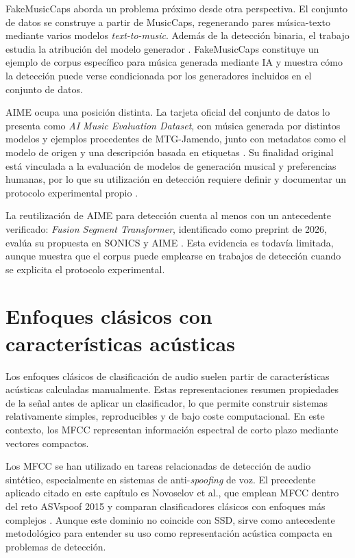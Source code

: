 FakeMusicCaps aborda un problema próximo desde otra perspectiva. El conjunto de datos se construye a partir de MusicCaps, regenerando pares música-texto mediante varios modelos \textit{text-to-music}. Además de la detección binaria, el trabajo estudia la atribución del modelo generador \cite{comanducci2024fakemusiccaps}. FakeMusicCaps constituye un ejemplo de corpus específico para música generada mediante IA y muestra cómo la detección puede verse condicionada por los generadores incluidos en el conjunto de datos.

AIME ocupa una posición distinta. La tarjeta oficial del conjunto de datos lo presenta como \textit{AI Music Evaluation Dataset}, con música generada por distintos modelos y ejemplos procedentes de MTG-Jamendo, junto con metadatos como el modelo de origen y una descripción basada en etiquetas \cite{discoethAIME}. Su finalidad original está vinculada a la evaluación de modelos de generación musical y preferencias humanas, por lo que su utilización en detección requiere definir y documentar un protocolo experimental propio \cite{groetschla2025benchmarking}.

La reutilización de AIME para detección cuenta al menos con un antecedente verificado: \textit{Fusion Segment Transformer}, identificado como preprint de 2026, evalúa su propuesta en SONICS y AIME \cite{kim2026fusionsegmenttransformer}. Esta evidencia es todavía limitada, aunque muestra que el corpus puede emplearse en trabajos de detección cuando se explicita el protocolo experimental.

\section{Enfoques clásicos con características acústicas}

Los enfoques clásicos de clasificación de audio suelen partir de características acústicas calculadas manualmente. Estas representaciones resumen propiedades de la señal antes de aplicar un clasificador, lo que permite construir sistemas relativamente simples, reproducibles y de bajo coste computacional. En este contexto, los MFCC representan información espectral de corto plazo mediante vectores compactos.

Los MFCC se han utilizado en tareas relacionadas de detección de audio sintético, especialmente en sistemas de anti-\textit{spoofing} de voz. El precedente aplicado citado en este capítulo es Novoselov et al., que emplean MFCC dentro del reto ASVspoof 2015 y comparan clasificadores clásicos con enfoques más complejos \cite{novoselov2015stcantispoofing}. Aunque este dominio no coincide con SSD, sirve como antecedente metodológico para entender su uso como representación acústica compacta en problemas de detección.

